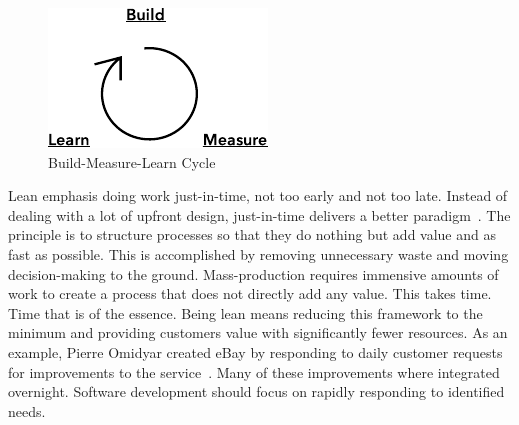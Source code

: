 \documentclass[english]{tktltiki2}
\begin{document}
\begin{figure}[h!]

    \vspace{1cm}
    \centering

    \includegraphics{figures/build-measure-learn}

    \caption{Build-Measure-Learn Cycle}
    \label{figure:build-measure-learn}

    \vspace{1cm}

\end{figure}

Lean emphasis doing work just-in-time, not too early and not too late. Instead of dealing with a lot of upfront design, just-in-time delivers a better paradigm~\cite{Pop02}. The principle is to structure processes so that they do nothing but add value and as fast as possible. This is accomplished by removing unnecessary waste and moving decision-making to the ground. Mass-production requires immensive amounts of work to create a process that does not directly add any value. This takes time. Time that is of the essence. Being lean means reducing this framework to the minimum and providing customers value with significantly fewer resources. As an example, Pierre Omidyar created eBay by responding to daily customer requests for improvements to the service~\cite{Pop02}. Many of these improvements where integrated overnight. Software development should focus on rapidly responding to identified needs.
\end{document}
